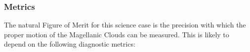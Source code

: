 

%
%


\subsubsection{Metrics}
\label{sec:\chpname:metrics}

The natural Figure of Merit for this science case is the precision
with which the proper motion of the Magellanic Clouds can be measured.
This is likely to depend on the following diagnostic metrics:


